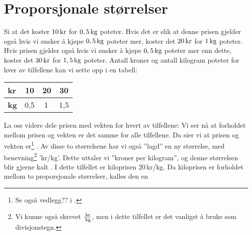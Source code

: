  \regv
{} 
\section{Proporsjonale størrelser \label{Propstorl}}
Si at det koster $ 10\,\textrm{kr}$ for $ 0,5\,\textrm{kg} $ poteter. Hvis det er slik at denne prisen gjelder også hvis vi ønsker å kjøpe $ 0,5\,\textrm{kg} $ poteter mer, koster det $ 20\,\textrm{kr} $ for $ 1\,\textrm{kg} $ poteter. Hvis prisen gjelder også hvis vi ønsker å kjøpe $ 0,5\,\textrm{kg} $ poteter mer enn dette, koster det $ 30\,\textrm{kr} $ for $ 1,5\,\textrm{kg} $ poteter. Antall kroner og antall kilogram poteter for hver av tilfellene kan vi sette opp i en tabell: \vs
\begin{center}
	\begin{tabular}{|l|c|c|c|}
		\hline
\textbf{kr} & 10  & 20 & 30 \\ \hline
\textbf{kg} & 0,5 & 1\,& 1,5 \\ \hline
	\end{tabular}
\end{center}
La oss videre dele prisen med vekten for hvert av tilfellene:
Vi ser nå at forholdet mellom prisen og vekten er det samme for alle tilfellene. Da sier vi at prisen og vekten er\footnote{Se også vedlegg?? i \mb.} . Av disse to størrelsene har vi også ''lagd'' en ny størrelse, med benevning\footnote{Vi kunne også skrevet $ \frac{\,\textrm{kr}}{\,\textrm{kg}} $, men i dette tilfellet er det vanligst å bruke \sym{/} som divisjonstegn.} 'kr/kg'. Dette uttaler vi ''kroner per kilogram'', og denne størrelsen blir gjerne kalt . I dette tilfellet er kiloprisen 20\,kr/kg. Da kiloprisen er forholdet mellom to proporsjonale størrelser, kalles den en  \regv
{} \regv

